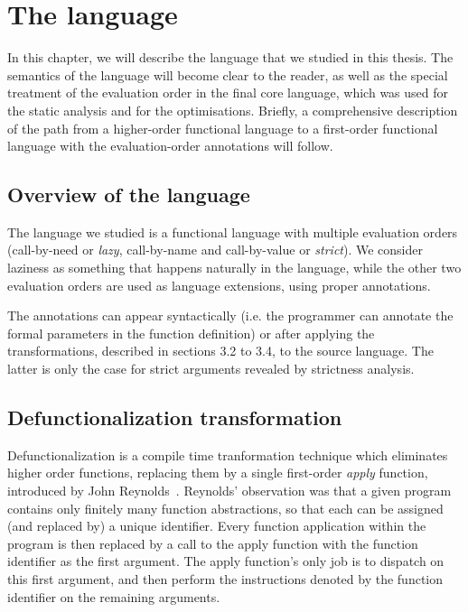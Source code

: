 \documentclass[diploma]{softlab-thesis}
\begin{document}
\chapter {The language}
\label{ch:language}

In this chapter, we will describe the language that we studied in this thesis.
The semantics of the language will become clear to the reader, as well as 
the special treatment of the evaluation order in the final core 
language, which was used for the static analysis and for the optimisations. Briefly, a 
comprehensive description of the path from a higher-order functional language 
to a first-order functional language with the evaluation-order annotations will follow.

\section {Overview of the language }
\label{sec:language-overview}

The language we studied is a functional language 
with multiple evaluation orders (call-by-need or 
\textit{lazy}, call-by-name and call-by-value or \textit{strict}).
We consider laziness as something that happens naturally in the language, while 
the other two evaluation orders are used as language extensions,
using proper annotations.

The annotations can appear syntactically (i.e. the programmer can annotate 
the formal parameters in the function definition) or 
after applying the transformations, described in sections 3.2 to 3.4, 
to the source language. The latter
is only the case for strict arguments revealed by strictness analysis.

\section {Defunctionalization transformation}
\label{sec:defunctionalization}

Defunctionalization is a compile time tranformation technique which eliminates higher order 
functions, replacing them by a single first-order \textit{apply} function, introduced by John Reynolds~\cite{Reynolds72definitionalinterpreters}.
Reynolds' observation was that a given program contains only finitely many function abstractions, so that each can 
be assigned (and replaced by) a unique identifier. Every function application within the program is then replaced 
by a call to the apply function with the function identifier as the first argument. The apply function's only job is 
to dispatch on this first argument, and then perform the instructions denoted by the function identifier on the 
remaining arguments.
\end{document}

